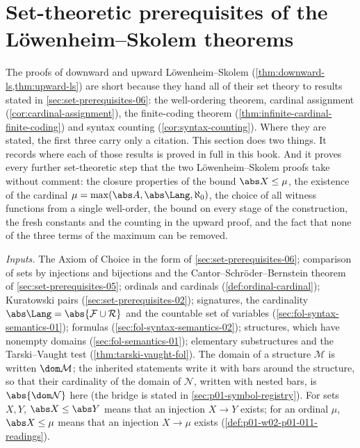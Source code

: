 \section{Set-theoretic prerequisites of the L\"owenheim--Skolem theorems}
\label{sec:p02-w02b-p02-029-ls-prerequisites}

The proofs of downward and upward L\"owenheim--Skolem
(\cref{thm:downward-ls,thm:upward-ls}) are short because they hand all of
their set theory to results stated in \cref{sec:set-prerequisites-06}: the
well-ordering theorem, cardinal assignment (\cref{cor:cardinal-assignment}),
the finite-coding theorem (\cref{thm:infinite-cardinal-finite-coding}) and
syntax counting (\cref{cor:syntax-counting}). Where they are stated, the
first three carry only a citation. This section does two things. It records
where each of those results is proved in full in this book. And it proves
every further set-theoretic step that the two L\"owenheim--Skolem proofs
take without comment: the closure properties of the bound
\(\abs X\leq\mu\), the existence of the cardinal
\(\mu=\max(\abs A,\abs\Lang,\aleph_0)\), the choice of all witness
functions from a single well-order, the bound on every stage of the
construction, the fresh constants and the counting in the upward proof, and
the fact that none of the three terms of the maximum can be removed.

\emph{Inputs.} The Axiom of Choice in the form of
\cref{sec:set-prerequisites-06}; comparison of sets by injections and
bijections and the Cantor--Schr\"oder--Bernstein theorem of
\cref{sec:set-prerequisites-05}; ordinals and cardinals
(\cref{def:ordinal-cardinal}); Kuratowski pairs
(\cref{sec:set-prerequisites-02}); signatures, the cardinality
\(\abs\Lang=\abs{\mathcal F\cup\mathcal R}\) and the countable set of
variables (\cref{sec:fol-syntax-semantics-01}); formulas
(\cref{sec:fol-syntax-semantics-02}); structures, which have nonempty domains
(\cref{sec:fol-semantics-01}); elementary substructures and the
Tarski--Vaught test (\cref{thm:tarski-vaught-fol}). The domain of a
structure \(\mathcal M\) is written \(\dom\mathcal M\); the inherited
statements write it with bars around the structure, so that their
cardinality of the domain of \(\mathcal N\), written with nested bars, is
\(\abs{\dom\mathcal N}\) here (the bridge is stated in
\cref{sec:p01-symbol-registry}). For sets \(X,Y\), \(\abs X\leq\abs Y\)
means that an injection \(X\to Y\) exists; for an ordinal \(\mu\),
\(\abs X\leq\mu\) means that an injection \(X\to\mu\) exists
(\cref{def:p01-w02-p01-011-readings}).


